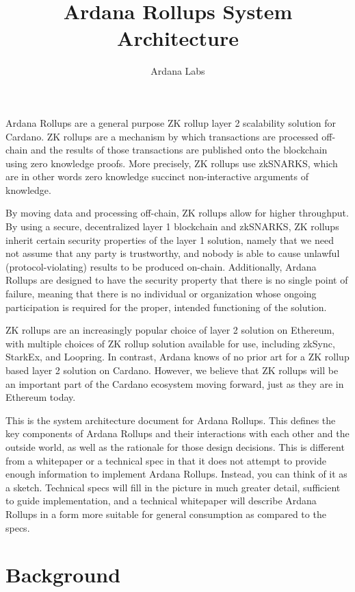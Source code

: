 \documentclass[12pt]{article}
\title{Ardana Rollups System Architecture}
\author{Ardana Labs}
\begin{document}
\maketitle


Ardana Rollups are a general purpose ZK rollup layer 2 scalability solution for Cardano. ZK rollups are a mechanism by which transactions are processed off-chain and the results of those transactions are published onto the blockchain using zero knowledge proofs. More precisely, ZK rollups use zkSNARKS, which are in other words zero knowledge succinct non-interactive arguments of knowledge.

By moving data and processing off-chain, ZK rollups allow for higher throughput. By using a secure, decentralized layer 1 blockchain and zkSNARKS, ZK rollups inherit certain security properties of the layer 1 solution, namely that we need not assume that any party is trustworthy, and nobody is able to cause unlawful (protocol-violating) results to be produced on-chain. Additionally, Ardana Rollups are designed to have the security property that there is no single point of failure, meaning that there is no individual or organization whose ongoing participation is required for the proper, intended functioning of the solution.

ZK rollups are an increasingly popular choice of layer 2 solution on Ethereum, with multiple choices of ZK rollup solution available for use, including zkSync, StarkEx, and Loopring. \cite{ethworks-20} In contrast, Ardana knows of no prior art for a ZK rollup based layer 2 solution on Cardano. However, we believe that ZK rollups will be an important part of the Cardano ecosystem moving forward, just as they are in Ethereum today.

This is the system architecture document for Ardana Rollups. This defines the key components of Ardana Rollups and their interactions with each other and the outside world, as well as the rationale for those design decisions. This is different from a whitepaper or a technical spec in that it does not attempt to provide enough information to implement Ardana Rollups. Instead, you can think of it as a sketch. Technical specs will fill in the picture in much greater detail, sufficient to guide implementation, and a technical whitepaper will describe Ardana Rollups in a form more suitable for general consumption as compared to the specs.

\section{Background}
\end{document}

